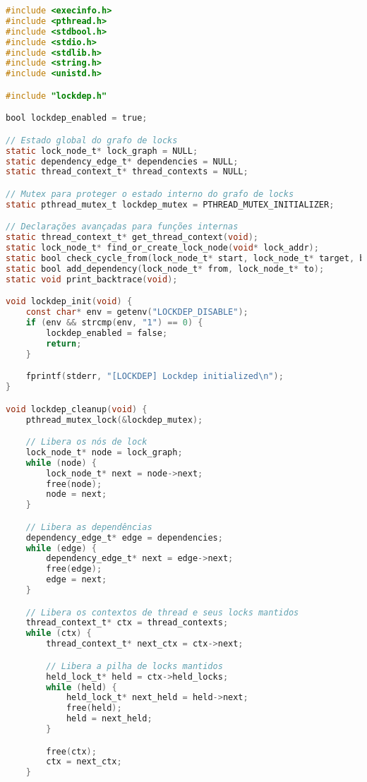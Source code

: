 \begin{lstlisting}[language=C, caption={lockdep\_core.c - Implementação do sistema de detecção de deadlocks}]
#include <execinfo.h>
#include <pthread.h>
#include <stdbool.h>
#include <stdio.h>
#include <stdlib.h>
#include <string.h>
#include <unistd.h>

#include "lockdep.h"

bool lockdep_enabled = true;

// Estado global do grafo de locks
static lock_node_t* lock_graph = NULL;
static dependency_edge_t* dependencies = NULL;
static thread_context_t* thread_contexts = NULL;

// Mutex para proteger o estado interno do grafo de locks
static pthread_mutex_t lockdep_mutex = PTHREAD_MUTEX_INITIALIZER;

// Declarações avançadas para funções internas
static thread_context_t* get_thread_context(void);
static lock_node_t* find_or_create_lock_node(void* lock_addr);
static bool check_cycle_from(lock_node_t* start, lock_node_t* target, bool* visited);
static bool add_dependency(lock_node_t* from, lock_node_t* to);
static void print_backtrace(void);

void lockdep_init(void) {
    const char* env = getenv("LOCKDEP_DISABLE");
    if (env && strcmp(env, "1") == 0) {
        lockdep_enabled = false;
        return;
    }

    fprintf(stderr, "[LOCKDEP] Lockdep initialized\n");
}

void lockdep_cleanup(void) {
    pthread_mutex_lock(&lockdep_mutex);

    // Libera os nós de lock
    lock_node_t* node = lock_graph;
    while (node) {
        lock_node_t* next = node->next;
        free(node);
        node = next;
    }

    // Libera as dependências
    dependency_edge_t* edge = dependencies;
    while (edge) {
        dependency_edge_t* next = edge->next;
        free(edge);
        edge = next;
    }

    // Libera os contextos de thread e seus locks mantidos
    thread_context_t* ctx = thread_contexts;
    while (ctx) {
        thread_context_t* next_ctx = ctx->next;

        // Libera a pilha de locks mantidos
        held_lock_t* held = ctx->held_locks;
        while (held) {
            held_lock_t* next_held = held->next;
            free(held);
            held = next_held;
        }

        free(ctx);
        ctx = next_ctx;
    }


\end{lstlisting}
